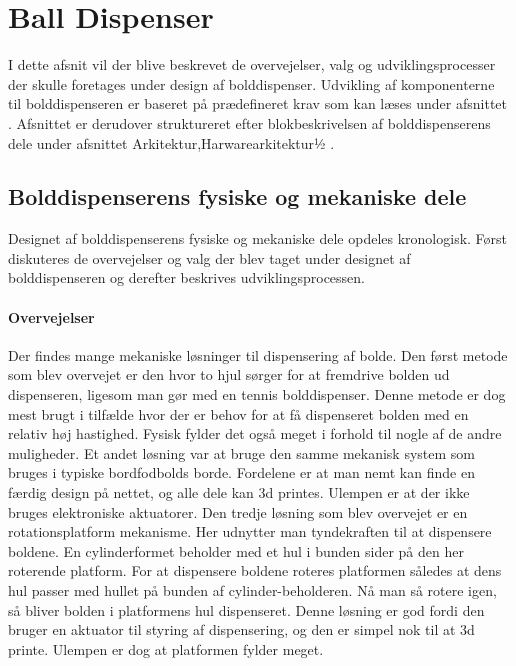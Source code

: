 \documentclass[Rapport/Rapport_main.tex]{subfiles}
\begin{document}
\section{Ball Dispenser}
I dette afsnit vil der blive beskrevet de overvejelser, valg og udviklingsprocesser der skulle foretages under design af bolddispenser. Udvikling af komponenterne til bolddispenseren er baseret på prædefineret krav som kan læses under afsnittet . Afsnittet er derudover struktureret efter blokbeskrivelsen af bolddispenserens dele under afsnittet Arkitektur,Harwarearkitektur½ .
\subsection{Bolddispenserens fysiske og mekaniske dele}
Designet af bolddispenserens fysiske og mekaniske dele opdeles kronologisk. Først diskuteres de overvejelser og valg der blev taget under designet af bolddispenseren og derefter beskrives udviklingsprocessen.

\paragraph{Overvejelser}
\newline\newline
Der findes mange mekaniske løsninger til dispensering af bolde. Den først metode som blev overvejet er den hvor to hjul sørger for at fremdrive bolden ud dispenseren, ligesom man gør med en tennis bolddispenser. Denne metode er dog mest brugt i tilfælde hvor der er behov for at få dispenseret bolden med en relativ høj hastighed. Fysisk fylder det også meget i forhold til nogle af de andre muligheder. Et andet løsning var at bruge den samme mekanisk system som bruges i typiske bordfodbolds borde. Fordelene er at man nemt kan finde en færdig design på nettet, og alle dele kan 3d printes. Ulempen er at der ikke bruges elektroniske aktuatorer.
Den tredje løsning som blev overvejet er en rotationsplatform mekanisme. Her udnytter man tyndekraften til at dispensere boldene. En cylinderformet beholder med et hul i bunden sider på den her roterende platform. For at dispensere boldene roteres platformen således at dens hul passer med hullet på bunden af cylinder-beholderen. Nå man så rotere igen, så bliver bolden i platformens hul dispenseret. Denne løsning er god fordi den bruger en aktuator til styring af dispensering, og den er simpel nok til at 3d printe. Ulempen er dog at platformen fylder meget.
\end{document}
